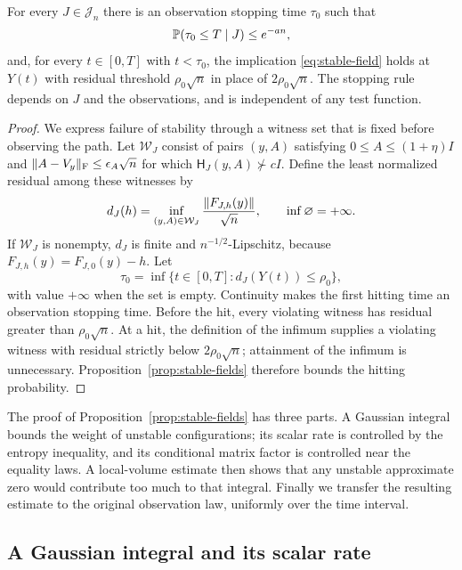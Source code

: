 \begin{corollary}\label{cor:stopping}
For every $J\in\mathcal J_n$ there is an observation stopping time $\tau_0$
such that
\[
 \mathbb P(\tau_0\le T\mid J)\le e^{-an},
\]
and, for every $t\in[0,T]$ with $t<\tau_0$, the implication \eqref{eq:stable-field} holds
at $Y(t)$ with residual threshold $\rho_0\sqrt n$ in place of
$2\rho_0\sqrt n$. The stopping rule depends on $J$ and the observations,
and is independent of any test function.
\end{corollary}

\begin{proof}
We express failure of stability through a witness set that is fixed
before observing the path. Let $\mathcal W_J$ consist of pairs $(y,A)$ satisfying
$0\le A\le(1+\eta)I$ and $\lVert A-V_y\rVert_{\mathrm F}\le\epsilon_A\sqrt n$
for which $\mathsf H_J(y,A)\not\succ cI$. Define the least
normalized residual among these witnesses by
\[
 d_J(h)=\inf_{(y,A)\in\mathcal W_J}
             \frac{\lVert F_{J,h}(y)\rVert}{\sqrt n},
 \qquad \inf\varnothing=+\infty.
\]
If $\mathcal W_J$ is nonempty, $d_J$ is finite and $n^{-1/2}$-Lipschitz,
because $F_{J,h}(y)=F_{J,0}(y)-h$. Let
\[
 \tau_0=\inf\{t\in[0,T]:d_J(Y(t))\le\rho_0\},
\]
with value $+\infty$ when the set is empty. Continuity makes the first
hitting time an observation stopping time.
Before the hit, every violating witness has residual greater than
$\rho_0\sqrt n$. At a hit, the definition of the infimum supplies a
violating witness with residual strictly below $2\rho_0\sqrt n$;
attainment of the infimum is unnecessary.
Proposition~\ref{prop:stable-fields} therefore bounds the hitting probability.
\end{proof}

The proof of Proposition~\ref{prop:stable-fields} has three parts. A
Gaussian integral bounds the weight of unstable configurations; its
scalar rate is controlled by the entropy inequality, and its conditional
matrix factor is controlled near the equality laws. A local-volume
estimate then shows that any unstable approximate zero would contribute
too much to that integral. Finally we transfer the resulting estimate to
the original observation law, uniformly over the time interval.

\subsection{A Gaussian integral and its scalar rate}

